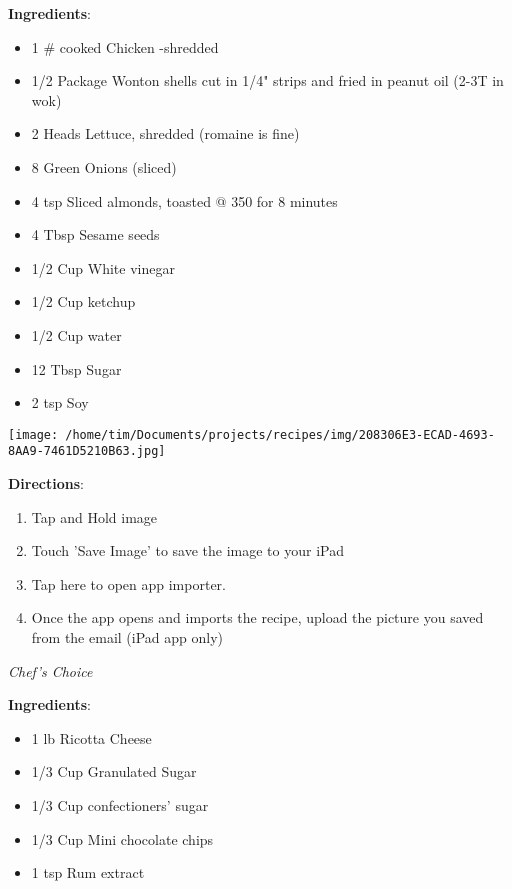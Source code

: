 \documentclass[11pt, twoside, openany]{book}
\begin{document}
\begin{minipage}[t]{0.8\linewidth}
\textbf{Ingredients}:\vspace{-3mm}
\begin{multicols}{2}
\begin{itemize}\setlength\itemsep{-1mm}
\item 1 # cooked Chicken -shredded
\item 1/2 Package Wonton shells cut in 1/4" strips and fried in peanut oil (2-3T in wok)
\item 2 Heads Lettuce, shredded (romaine is fine)
\item 8 Green Onions (sliced)
\item 4 tsp Sliced almonds, toasted @ 350 for 8 minutes
\item 4 Tbsp Sesame seeds
\item 1/2 Cup White vinegar
\item 1/2 Cup ketchup
\item 1/2 Cup water
\item 12 Tbsp Sugar
\item 2 tsp Soy
\end{itemize}
\end{multicols}
\end{minipage}
\begin{minipage}[t]{0.2\linewidth}
\centering \strut\vspace*{-\baselineskip}\newline
\texttt{[image: /home/tim/Documents/projects/recipes/img/208306E3-ECAD-4693-8AA9-7461D5210B63.jpg]}\\
\end{minipage}\vspace{3mm}
\textbf{Directions}:
\vspace{-3mm}\begin{enumerate}\setlength\itemsep{-1mm}
\item Tap and Hold image
\item Touch 'Save Image' to save the image to your iPad
\item Tap here to open app importer.
\item Once the app opens and imports the recipe, upload the picture you saved from the email (iPad app only)
\end{enumerate}
 \label{traditional-italian-cannoli-filling}\hfill\textit{Chef's Choice}\\
\begin{minipage}[t]{0.8\linewidth}
\textbf{Ingredients}:\vspace{-3mm}
\begin{multicols}{2}
\begin{itemize}\setlength\itemsep{-1mm}
\item 1 lb Ricotta Cheese
\item 1/3 Cup Granulated Sugar
\item 1/3 Cup confectioners' sugar
\item 1/3 Cup Mini chocolate chips
\item 1 tsp Rum extract
\end{itemize}
\end{multicols}
\end{minipage}
\end{document}
